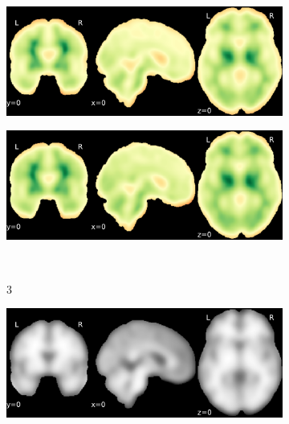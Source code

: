 \documentclass{article}
\begin{document}
\begin{appendices}
\begin{landscape}
\begin{figure}
\begin{subfigure}[t]{0.2\paperheight}
            \end{subfigure}
            \begin{subfigure}[t]{0.2\paperheight}
                \centering
                \includegraphics[width=\textwidth]{figures/sig/15mm/rs_ds001771_sub-36_sig.pdf}
            \end{subfigure}
            \begin{subfigure}[t]{0.2\paperheight}
                \centering
                \includegraphics[width=\textwidth]{figures/sig/15mm/rr.rs_ds001771_sub-36_sig.pdf}
            \end{subfigure} \\
            \begin{subfigure}[b][][c]{0.01\paperwidth} 3 \vspace*{15pt} \end{subfigure}
            \begin{subfigure}[t]{0.2\paperheight}
                \centering
                \includegraphics[width=\textwidth]{figures/sig/15mm/ieee_ds000256_sub-CTS201.pdf}

\end{subfigure}
\end{figure}
\end{landscape}
\end{appendices}
\end{document}
